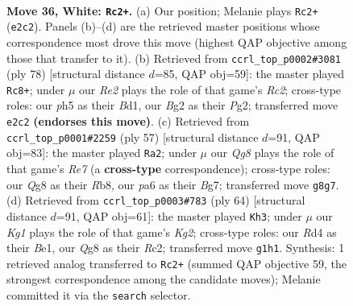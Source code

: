 \documentclass[11pt]{article}
\begin{document}
\clearpage

\begin{figure}[p]\centering
\begin{subfigure}{0.46\textwidth}\centering
\resizebox{\linewidth}{!}{%
\newchessgame
\chessboard[
  setfen={r2n2Q1/1pk3p1/p4pN1/6np/3R4/4P1P1/PP2RPBP/6K1 w - - 1 36},
  showmover=false,
  pgfstyle=straightmove, color=movearrow, markmove={e2-c2}
]}
\caption{}
\end{subfigure}\hfill
\begin{subfigure}{0.46\textwidth}\centering
\resizebox{\linewidth}{!}{%
\newchessgame
\chessboard[
  setfen={6k1/3n1p2/1q2p1p1/r2n3p/p2PN3/Q3P2P/2R2PP1/3B2K1 w - - 20 40},
  showmover=false,
  pgfstyle=straightmove, color=movearrow, markmove={c2-c8}
]}
\caption{}
\end{subfigure}
\\[4pt]
\begin{subfigure}{0.46\textwidth}\centering
\resizebox{\linewidth}{!}{%
\newchessgame
\chessboard[
  setfen={1r4k1/5pbp/2R1p1p1/pN1n4/P2P3P/BR4P1/4rPK1/8 b - - 1 29},
  showmover=false,
  pgfstyle=straightmove, color=movearrow, markmove={e2-a2}
]}
\caption{}
\end{subfigure}\hfill
\begin{subfigure}{0.46\textwidth}\centering
\resizebox{\linewidth}{!}{%
\newchessgame
\chessboard[
  setfen={2r2k2/6p1/1p1bp2p/3n4/P6P/2pN2P1/P1R1PPK1/4B3 w - - 4 33},
  showmover=false,
  pgfstyle=straightmove, color=movearrow, markmove={g2-h3}
]}
\caption{}
\end{subfigure}
\caption{\textbf{Move 36, White: \texttt{Rc2+}.} (a) Our position; Melanie plays \texttt{Rc2+} (\texttt{e2c2}). Panels (b)--(d) are the retrieved master positions whose correspondence most drove this move (highest QAP objective among those that transfer to it). (b) Retrieved from \texttt{ccrl\_top\_p0002\#3081} (ply 78) [structural distance $d$=85, QAP obj=59]: the master played \texttt{Rc8+}; under $\mu$ our \emph{Re2} plays the role of that game's \emph{Rc2}; cross-type roles: our \emph{p}h5 as their \emph{B}d1, our \emph{B}g2 as their \emph{P}g2; transferred move \texttt{e2c2} \textbf{(endorses this move)}. (c) Retrieved from \texttt{ccrl\_top\_p0001\#2259} (ply 57) [structural distance $d$=91, QAP obj=83]: the master played \texttt{Ra2}; under $\mu$ our \emph{Qg8} plays the role of that game's \emph{Re7} (a \textbf{cross-type} correspondence); cross-type roles: our \emph{Q}g8 as their \emph{R}b8, our \emph{p}a6 as their \emph{B}g7; transferred move \texttt{g8g7}. (d) Retrieved from \texttt{ccrl\_top\_p0003\#783} (ply 64) [structural distance $d$=91, QAP obj=61]: the master played \texttt{Kh3}; under $\mu$ our \emph{Kg1} plays the role of that game's \emph{Kg2}; cross-type roles: our \emph{R}d4 as their \emph{B}e1, our \emph{Q}g8 as their \emph{R}c2; transferred move \texttt{g1h1}. Synthesis: 1 retrieved analog transferred to \texttt{Rc2+} (summed QAP objective 59, the strongest correspondence among the candidate moves); Melanie committed it via the \texttt{search} selector.}
\label{fig:thought-m70}
\end{figure}
\end{document}
